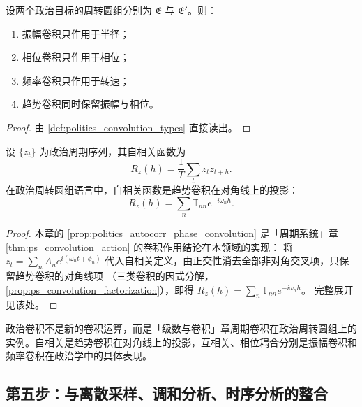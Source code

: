 \begin{theorem}[三类卷积在政治周转圆组上的作用]\label{thm:politics_convolution_action}
设两个政治目标的周转圆组分别为 $\mathfrak E$ 与 $\mathfrak E'$。则：
\begin{enumerate}[label=(\roman*)]
    \item 振幅卷积只作用于半径；
    \item 相位卷积只作用于相位；
    \item 频率卷积只作用于转速；
    \item 趋势卷积同时保留振幅与相位。
\end{enumerate}
\end{theorem}

\begin{proof}
由 \cref{def:politics_convolution_types} 直接读出。
\end{proof}

\begin{proposition}[自相关与趋势卷积]\label{prop:politics_autocorr_phase_convolution}
设 $\{z_t\}$ 为政治周期序列，其自相关函数为
\[
R_z(h)=\frac1T\sum_t z_t\overline{z_{t+h}}.
\]
在政治周转圆组语言中，自相关函数是趋势卷积在对角线上的投影：
\[
R_z(h)=\sum_n\mathbb T_{nn}e^{-i\omega_n h}.
\]
\end{proposition}

\begin{proof}
本章的 \cref{prop:politics_autocorr_phase_convolution} 是「周期系统」章 \cref{thm:ps_convolution_action} 的卷积作用结论在本领域的实现：
将 $z_t=\sum_n A_n e^{i(\omega_n t+\phi_n)}$ 代入自相关定义，由正交性消去全部非对角交叉项，只保留趋势卷积的对角线项
（三类卷积的因式分解，\cref{prop:ps_convolution_factorization}），即得 $R_z(h)=\sum_n\mathbb T_{nn}e^{-i\omega_n h}$。
完整展开见该处。
\end{proof}

\begin{remark}[政治卷积与周期卷积的关系]\label{rem:politics_convolution_relation}
政治卷积不是新的卷积运算，而是「级数与卷积」章周期卷积在政治周转圆组上的实例。自相关是趋势卷积在对角线上的投影，互相关、相位耦合分别是振幅卷积和频率卷积在政治学中的具体表现。
\end{remark}

\subsection{第五步：与离散采样、调和分析、时序分析的整合}

